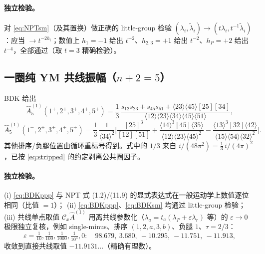 \documentclass[11pt]{article}
\newcommand{\Cx}{\mathcal{C}_x}
\newcommand{\ab}[1]{\langle #1\rangle}
\newcommand{\sq}[1]{[#1]}
\newcommand{\Ahat}{\widehat{A}}
\newcommand{\Pt}{P}
\begin{document}
\paragraph{独立检验。}对 \eqref{eq:NPTsm}（及其置换）做正确的 little-group 检验
$(\lambda_i,\widetilde\lambda_i)\to(t\lambda_i,t^{-1}\widetilde\lambda_i)$：应当 $\to t^{-2h_i}$；数值上 $h_1=-1$ 给出 $t^{+2}$、$h_{2,3}=+1$ 给出 $t^{-2}$、$h_\Pt=+2$ 给出 $t^{-4}$，全部通过（取 $t=3$ 精确检验）。

\subsection{一圈纯 YM 共线振幅（$n+2=5$）}
BDK \cite{BDK1993} 给出
\begin{equation}
\Ahat^{(1)}_5(1^+,2^+,3^+,4^+,5^+)=\frac13\,
\frac{s_{12}s_{23}+s_{45}s_{51}+\ab{23}\ab{45}\sq{25}\sq{34}}
{\ab{12}\ab{23}\ab{34}\ab{45}\ab{51}},
\label{eq:BDKppp}
\end{equation}
\begin{equation}
\Ahat^{(1)}_5(1^-,2^+,3^+,4^+,5^+)=\frac13\,\frac{1}{\ab{34}^2}\Big[
\frac{\sq{25}^3}{\sq{12}\sq{51}}
+\frac{\ab{14}^3\sq{45}\ab{35}}{\ab{12}\ab{23}\ab{45}^2}
-\frac{\ab{13}^3\sq{32}\ab{42}}{\ab{15}\ab{54}\ab{32}^2}\Big].
\label{eq:BDKsm}
\end{equation}
其他排序/负腿位置由循环重标号得到。式中的 $1/3$ 来自 $i/(48\pi^2)=\frac13\, i/(4\pi)^2$，已按 \eqref{eq:stripped} 的约定剥离公共圈因子。

\paragraph{独立检验。}
(i) \eqref{eq:BDKppp} 与 NPT 式 (1.2)/(11.9) 的显式表达式在一般运动学上数值逐位相同（比值 $=1$）；
(ii) \eqref{eq:BDKppp}、\eqref{eq:BDKsm} 均通过 little-group 检验；
(iii) 共线单点取值 $\Cx\Ahat^{(1)}$ 用离共线参数化（$\lambda_a=t_a(\lambda_\Pt+\varepsilon\lambda_r)$ 等）的 $\varepsilon\to0$ 极限独立复核，例如 single-minus、排序 $(1,2,a,3,b)$、负腿 $1$、$\tau=2/3$：
\[
\varepsilon=\tfrac1{10},\tfrac1{100},\tfrac1{1000},\tfrac1{10^4},0:\quad
98.679,\ 3.680,\ -10.295,\ -11.751,\ -11.913,
\]
收敛到直接共线取值 $-11.9131\ldots$（精确有理数）。
\end{document}
